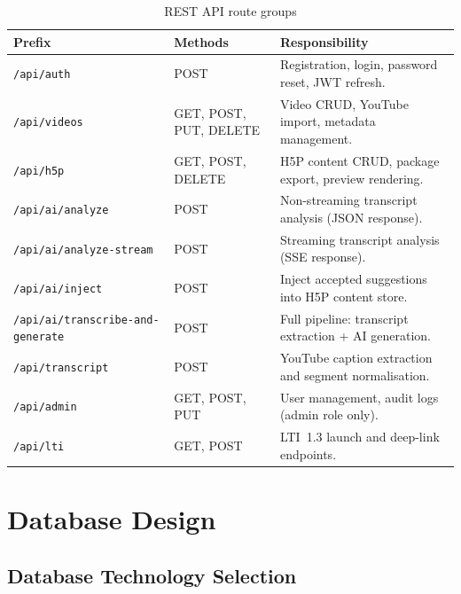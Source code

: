 \begin{table}[H]
  \centering
  \caption{REST API route groups}
  \label{tab:api_routes}
  \begin{tabularx}{\linewidth}{llX}
    \toprule
    \textbf{Prefix}            & \textbf{Methods}               & \textbf{Responsibility} \\
    \midrule
    \texttt{/api/auth}         & POST                           & Registration, login, password reset, JWT refresh. \\
    \texttt{/api/videos}       & GET, POST, PUT, DELETE         & Video CRUD, YouTube import, metadata management. \\
    \texttt{/api/h5p}          & GET, POST, DELETE              & H5P content CRUD, package export, preview rendering. \\
    \texttt{/api/ai/analyze}   & POST                           & Non-streaming transcript analysis (JSON response). \\
    \texttt{/api/ai/analyze-stream} & POST                      & Streaming transcript analysis (SSE response). \\
    \texttt{/api/ai/inject}    & POST                           & Inject accepted suggestions into H5P content store. \\
    \texttt{/api/ai/transcribe-and-generate} & POST             & Full pipeline: transcript extraction + AI generation. \\
    \texttt{/api/transcript}   & POST                           & YouTube caption extraction and segment normalisation. \\
    \texttt{/api/admin}        & GET, POST, PUT                 & User management, audit logs (admin role only). \\
    \texttt{/api/lti}          & GET, POST                      & LTI~1.3 launch and deep-link endpoints. \\
    \bottomrule
  \end{tabularx}
\end{table}

\section{Database Design}

\subsection{Database Technology Selection}

